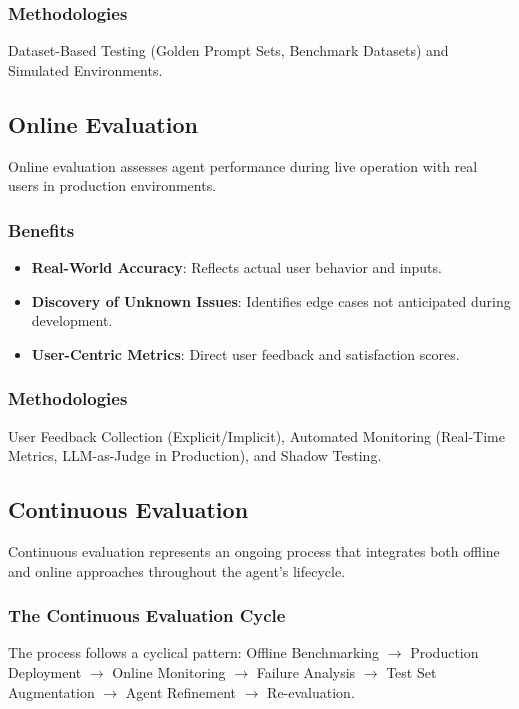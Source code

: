 \begin{TNtwocol}
\subsubsection{Methodologies}
Dataset-Based Testing (Golden Prompt Sets, Benchmark Datasets) and Simulated Environments.

\subsection{Online Evaluation}
Online evaluation assesses agent performance during live operation with real users in production environments.
\subsubsection{Benefits}
\begin{itemize}
    \item \textbf{Real-World Accuracy}: Reflects actual user behavior and inputs.
    \item \textbf{Discovery of Unknown Issues}: Identifies edge cases not anticipated during development.
    \item \textbf{User-Centric Metrics}: Direct user feedback and satisfaction scores.
\end{itemize}
\subsubsection{Methodologies}
User Feedback Collection (Explicit/Implicit), Automated Monitoring (Real-Time Metrics, LLM-as-Judge in Production), and Shadow Testing.

\subsection{Continuous Evaluation}
Continuous evaluation represents an ongoing process that integrates both offline and online approaches throughout the agent's lifecycle.
\subsubsection{The Continuous Evaluation Cycle}
The process follows a cyclical pattern: Offline Benchmarking $\rightarrow$ Production Deployment $\rightarrow$ Online Monitoring $\rightarrow$ Failure Analysis $\rightarrow$ Test Set Augmentation $\rightarrow$ Agent Refinement $\rightarrow$ Re-evaluation.
\end{TNtwocol}
